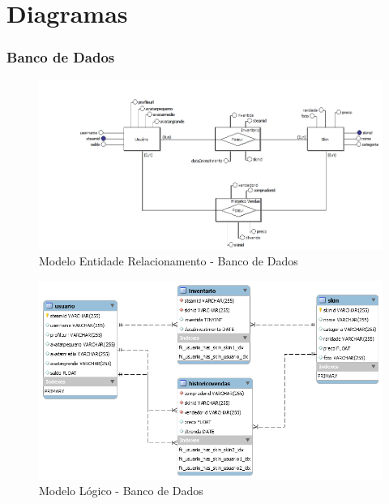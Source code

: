 \chapter[Diagramas]{Diagramas}

 \subsection{Banco de Dados}

  \begin{figure}[!htb]
        \centering
        \includegraphics[scale=0.5]{Imagens/Relacionamento.png}
        \caption{Modelo Entidade Relacionamento - Banco de Dados}
 \end{figure}

  \begin{figure}[!htb]
        \centering
        \includegraphics[scale=0.6]{Imagens/Logico.png}
        \caption{Modelo Lógico - Banco de Dados}
 \end{figure}

